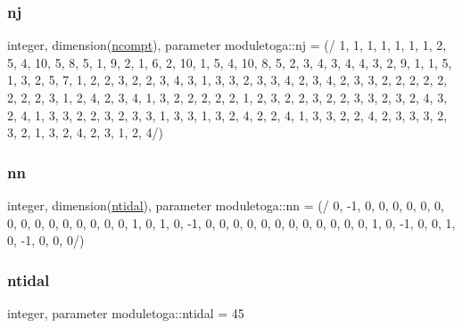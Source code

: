 \mbox{\label{namespacemoduletoga_a35b3164d881bfedd7e51ef9b88f7251a}} 
\subsubsection{\texorpdfstring{nj}{nj}}
{\footnotesize\ttfamily integer, dimension(\mbox{\hyperlink{namespacemoduletoga_a151be23f63401a1bb1a76f0a4c30d9ca}{ncompt}}), parameter moduletoga\+::nj = (/ 1, 1, 1, 1, 1, 1, 1, 2, 5, 4, 10, 5, 8, 5, 1, 9, 2, 1, 6, 2, 10, 1, 5, 4, 10, 8, 5, 2, 3, 4, 3, 4, 4, 3, 2, 9, 1, 1, 5, 1, 3, 2, 5, 7, 1, 2, 2, 3, 2, 2, 3, 4, 3, 1, 3, 3, 2, 3, 3, 4, 2, 3, 4, 2, 3, 3, 2, 2, 2, 2, 2, 2, 2, 2, 3, 1, 2, 4, 2, 3, 4, 1, 3, 2, 2, 2, 2, 2, 1, 2, 3, 2, 2, 3, 2, 2, 3, 3, 2, 3, 2, 4, 3, 2, 4, 1, 3, 3, 2, 2, 3, 2, 3, 3, 1, 3, 3, 1, 3, 2, 4, 2, 2, 4, 1, 3, 3, 2, 2, 4, 2, 3, 3, 3, 2, 3, 2, 1, 3, 2, 4, 2, 3, 1, 2, 4/)\hspace{0.3cm}{\ttfamily [private]}}

\mbox{\label{namespacemoduletoga_a81315410d16519be6056987f27dd8dd9}} 
\subsubsection{\texorpdfstring{nn}{nn}}
{\footnotesize\ttfamily integer, dimension(\mbox{\hyperlink{namespacemoduletoga_ae4b0b997b6803ae8647fdd97f2dda666}{ntidal}}), parameter moduletoga\+::nn = (/ 0, -\/1, 0, 0, 0, 0, 0, 0, 0, 0, 0, 0, 0, 0, 0, 0, 0, 1, 0, 1, 0, -\/1, 0, 0, 0, 0, 0, 0, 0, 0, 0, 0, 0, 0, 1, 0, -\/1, 0, 0, 1, 0, -\/1, 0, 0, 0/)\hspace{0.3cm}{\ttfamily [private]}}

\mbox{\label{namespacemoduletoga_ae4b0b997b6803ae8647fdd97f2dda666}} 
\subsubsection{\texorpdfstring{ntidal}{ntidal}}
{\footnotesize\ttfamily integer, parameter moduletoga\+::ntidal = 45\hspace{0.3cm}{\ttfamily [private]}}

